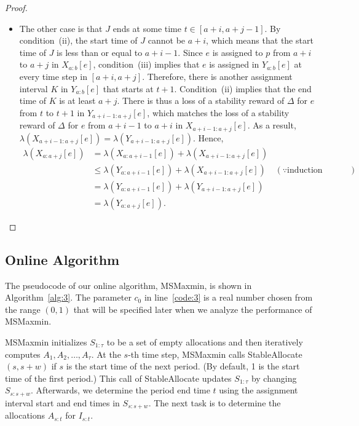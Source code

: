 \documentclass[11pt,a4paper]{article}
\renewcommand{\leq}{\leqslant}
\begin{document}
\begin{proof}
\begin{itemize}
		\item The other case is that $J$ ends at some time $t \in [a+i,a+j-1]$.  By condition~(ii), the start time of $J$ cannot be $a+i$, which means that the start time of $J$ is less than or equal to $a+i-1$.   Since $e$ is assigned to $p$ from $a+i$ to $a+j$ in $X_{a:b}[e]$, condition~(iii) implies that $e$ is assigned in $Y_{a:b}[e]$ at every time step in $[a+i,a+j]$.  Therefore, there is another assignment interval $K$ in $Y_{a:b}[e]$ that starts at $t+1$.  Condition~(ii) implies that the end time of $K$ is at least $a+j$.  There is thus a loss of a stability reward of $\Delta$ for $e$ from $t$ to $t+1$ in $Y_{a+i-1:a+j}[e]$, which matches the loss of a stability reward of $\Delta$ for $e$ from $a+i-1$ to $a+i$ in $X_{a+i-1:a+j}[e]$.  %
		As a result, $\lambda(X_{a+i-1:a+j}[e])  = \lambda(Y_{a+i-1:a+j}[e])$.
		Hence,
		\begin{align*}
			\lambda(X_{a:a+j}[e]) & = \lambda(X_{a:a+i-1}[e]) + \lambda(X_{a+i-1:a+j}[e]) \\
			& \leq  \lambda(Y_{a:a+i-1}[e]) + \lambda(X_{a+i-1:a+j}[e])  
			& (\because \text{induction assumption}) \\
			& =  \lambda(Y_{a:a+i-1}[e]) + \lambda(Y_{a+i-1:a+j}[e])  \\
			& = \lambda(Y_{a:a+j}[e]).
		\end{align*}
	\end{itemize}
\end{proof}





\subsection{Online Algorithm}


The pseudocode of our online algorithm, MSMaxmin, is shown in Algorithm~\ref{alg:3}.  The parameter $c_0$ in line~\ref{code:3} is a real number chosen from the range $(0,1)$ that will be specified later when we analyze the performance of MSMaxmin.  

MSMaxmin initializes $S_{1:\tau}$ to be a set of empty allocations and then iteratively computes $A_1,A_2,\ldots,A_\tau$.   At the $s$-th time step, MSMaxmin calls StableAllocate$(s,s+w)$ if $s$ is the start time of the next period.   (By default, 1 is the start time of the first period.)   This call of StableAllocate updates $S_{1:\tau}$ by changing $S_{s:s+w}$.  Afterwards, we determine the period end time $t$ using the assignment interval start and end times in $S_{s:s+w}$.  The next task is to determine the allocations $A_{s:t}$ for $I_{s:t}$.
\end{document}
